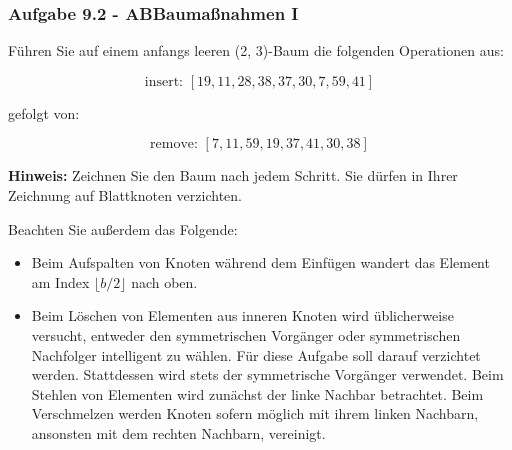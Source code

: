 \begin{frame}[t]
    \frametitle{Aufgabe 9.2 - ABBaumaßnahmen I}
    \scriptsize

    Führen Sie auf einem anfangs leeren (2, 3)-Baum die folgenden Operationen aus:

    $$
        \text{insert: } [19, 11, 28, 38, 37, 30, 7, 59, 41]
    $$

    gefolgt von:

    $$
        \text{remove: } [7, 11, 59, 19, 37, 41, 30, 38]
    $$

    \textbf{Hinweis:} Zeichnen Sie den Baum nach jedem Schritt. Sie dürfen in Ihrer Zeichnung auf
    Blattknoten verzichten.

    Beachten Sie außerdem das Folgende:

    \begin{itemize}
        \item Beim Aufspalten von Knoten während dem Einfügen wandert das Element am Index $\lfloor b/2 \rfloor$ nach oben.
        \item Beim Löschen von Elementen aus inneren Knoten wird üblicherweise versucht, entweder
              den symmetrischen Vorgänger oder symmetrischen Nachfolger intelligent zu
              wählen. Für diese Aufgabe soll darauf verzichtet werden. Stattdessen wird stets der
              symmetrische Vorgänger verwendet. Beim Stehlen von Elementen wird zunächst der
              linke Nachbar betrachtet. Beim Verschmelzen werden Knoten sofern möglich mit ihrem
              linken Nachbarn, ansonsten mit dem rechten Nachbarn, vereinigt.
    \end{itemize}

\end{frame}



